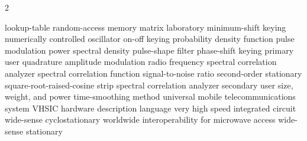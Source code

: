 \begin{center}
\begin{multicols}{2}
\begin{acronym}[CubeMATLABSat]
  {lookup-table random-access memory}
  {matrix laboratory}
     {minimum-shift keying}
     {numerically controlled oscillator}
     {on-off keying}
     {probability density function}
      {pulse modulation}
     {power spectral density}
     {pulse-shape filter}
     {phase-shift keying}
      {primary user}
     {quadrature amplitude modulation}
      {radio frequency}
     {spectral correlation analyzer}
     {spectral correlation function}
     {signal-to-noise ratio}
     {second-order stationary}
    {square-root-raised-cosine}
    {strip spectral correlation analyzer}
      {secondary user}
    {size, weight, and power}
     {time-smoothing method}
    {universal mobile telecommunications system}
    {VHSIC hardware description language}
   {very high speed integrated circuit}
     {wide-sense cyclostationary}
   {worldwide interoperability for microwave access}
     {wide-sense stationary} 

\end{acronym}
\end{multicols}
\end{center}
